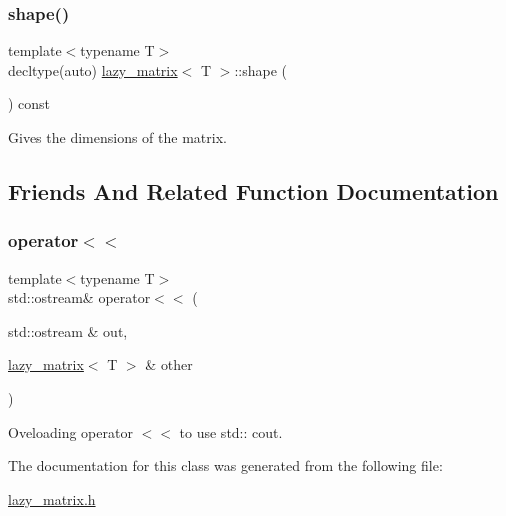 \subsubsection{\texorpdfstring{shape()}{shape()}}
{\footnotesize\ttfamily template$<$typename T$>$ \\
decltype(auto) \mbox{\hyperlink{classlazy__matrix}{lazy\+\_\+matrix}}$<$ T $>$\+::shape (\begin{DoxyParamCaption}{ }\end{DoxyParamCaption}) const\hspace{0.3cm}{\ttfamily [inline]}}



Gives the dimensions of the matrix. 



\subsection{Friends And Related Function Documentation}
\mbox{\label{classlazy__matrix_a2840b44da6b181bb3dfbdf8ffd104fec}} 
\subsubsection{\texorpdfstring{operator$<$$<$}{operator<<}}
{\footnotesize\ttfamily template$<$typename T$>$ \\
std\+::ostream\& operator$<$$<$ (\begin{DoxyParamCaption}\item[{std\+::ostream \&}]{out,  }\item[{\mbox{\hyperlink{classlazy__matrix}{lazy\+\_\+matrix}}$<$ T $>$ \&}]{other }\end{DoxyParamCaption})\hspace{0.3cm}{\ttfamily [friend]}}



Oveloading operator $<$$<$ to use std\+:\+: cout. 



The documentation for this class was generated from the following file\+:\begin{DoxyCompactItemize}
\item 
\mbox{\hyperlink{lazy__matrix_8h}{lazy\+\_\+matrix.\+h}}\end{DoxyCompactItemize}
